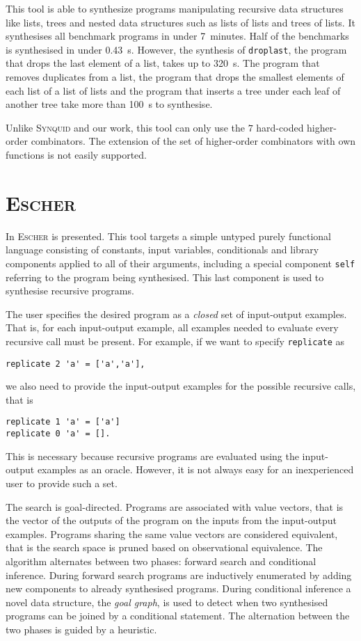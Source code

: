 This tool is able to synthesize programs manipulating recursive data structures like lists, trees and nested data structures such as lists of lists and trees of lists.
It synthesises all benchmark programs in under 7~minutes. Half of the benchmarks is synthesised in under \SI{0.43}{s}. However, the synthesis of \lstinline!droplast!, the program that drops the last element of a list, takes up to \SI{320}{s}. The program that removes duplicates from a list, the program that drops the smallest elements of each list of a list of lists and the program that inserts a tree under each leaf of another tree take more than \SI{100}{s} to synthesise.

Unlike \textsc{Synquid} and our work, this tool can only use the $7$ hard-coded higher-order combinators. The extension of the set of higher-order combinators with own functions is not easily supported.


\section{\mdseries\textsc{Escher}}

In \cite{EscherPaper} \textsc{Escher} is presented. This tool targets a simple untyped purely functional language consisting of constants, input variables, conditionals and library components applied to all of their arguments, including a special component \lstinline!self! referring to the program being synthesised. This last component is used to synthesise recursive programs.

The user specifies the desired program as a \emph{closed} set of input-output examples. That is, for each input-output example, all examples needed to evaluate every recursive call must be present. For example, if we want to specify \lstinline!replicate! as
\begin{lstlisting}[style=plain]
replicate 2 'a' = ['a','a'],
\end{lstlisting}
we also need to provide the input-output examples for the possible recursive calls, that is
\begin{lstlisting}[style=plain]
replicate 1 'a' = ['a']
replicate 0 'a' = [].
\end{lstlisting}
This is necessary because recursive programs are evaluated using the input-output examples as an oracle. However, it is not always easy for an inexperienced user to provide such a set.

The search is goal-directed. Programs are associated with value vectors, that is the vector of the outputs of the program on the inputs from the input-output examples. Programs sharing the same value vectors are considered equivalent, that is the search space is pruned based on observational equivalence.
The algorithm alternates between two phases: forward search and conditional inference. During forward search programs are inductively enumerated by adding new components to already synthesised programs. During conditional inference a novel data structure, the \emph{goal graph}, is used to detect when two synthesised programs can be joined by a conditional statement. The alternation between the two phases is guided by a heuristic.

